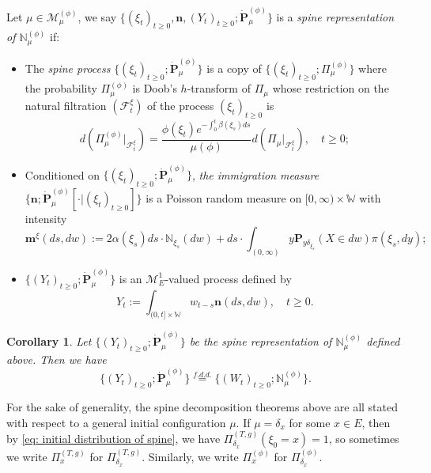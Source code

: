 \documentclass[12pt, a4paper]{amsart}
\newtheorem{cro}[thm]{Corollary}
\theoremstyle{definition}
\numberwithin{equation}{section}
\begin{document}
	Let $\mu \in \mathcal M^{(\phi)}_\mu$, we say $\{(\xi_t)_{t\geq 0}, \mathbf n, (Y_t)_{ t\geq 0}; \dot {\mathbf P}^{(\phi)}_\mu\}$ is a \emph{spine representation of $\mathbb N^{(\phi)}_\mu$} if:
\begin{itemize}
\item
	The \emph{spine process} $\{(\xi_t)_{t\geq 0}; \dot{\mathbf P}^{(\phi)}_\mu\}$ is a copy of $\{(\xi_t)_{t\geq 0}; \Pi^{(\phi)}_{\mu}\}$ where the probability $\Pi_{\mu}^{(\phi)}$ is Doob's $h$-transform of $\Pi_\mu$ whose restriction on the natural filtration $(\mathscr F_t^\xi)$ of the process $(\xi_t)_{t\geq 0}$ is
\begin{equation}
	d(\Pi_{\mu}^{(\phi)} |_{\mathscr F_t^\xi})
	= \frac{\phi(\xi_t)e^{-\int_0^t \beta(\xi_s)ds}}{\mu(\phi)} d(\Pi_{\mu} |_{\mathscr F_t^\xi}),
	\quad t\geq 0;
\end{equation}
\item
	Conditioned on $\{(\xi_t)_{t\geq 0}; \dot{\mathbf P}^{(\phi)}_\mu\}$, \emph{the immigration measure} $\{\mathbf n; \dot{\mathbf P}^{(\phi)}_\mu[\cdot |(\xi_t)_{t\geq 0}]\}$ is a Poisson random measure on $[0,\infty ) \times \mathbb W$ with
    intensity
\begin{equation}\label{eq:meanMeasImmigr}
	\mathbf m^\xi(ds,dw)
	:= 2 \alpha(\xi_s) ds \cdot \mathbb N_{\xi_s}(dw) + ds \cdot \int_{(0,\infty)} y \mathbf P_{y\delta_{\xi_s}}(X\in dw) \pi(\xi_s,dy);
\end{equation}
\item
	$\{(Y_t)_{t\geq 0}; \dot{\mathbf P}^{(\phi)}_\mu\}$ is an $\mathcal M^1_E$-valued process defined by
\begin{equation}\label{eq:defSpinImmigr}
	Y_t
	:= \int_{(0,t] \times \mathbb W} w_{t-s} \mathbf n(ds,dw),
	\quad t\geq 0.
\end{equation}
\end{itemize}

\begin{cro}
	Let $\{(Y_t)_{t\geq 0}; \dot {\mathbf P}^{(\phi)}_\mu\}$ be the spine representation of $\mathbb N^{(\phi)}_\mu$ defined above.
	Then we have
\begin{equation}
	\{(Y_t)_{t\geq 0}; \dot{\mathbf P}^{(\phi)}_\mu\}
	\overset{f.d.d.}{=} \{(W_t)_{t\geq 0}; \mathbb N_\mu^{(\phi)}\}.
\end{equation}
\end{cro}

	For the sake of generality, the spine decomposition theorems above are all stated with respect to a general initial configuration $\mu$.
	If $\mu = \delta_x$ for some $x\in E$, then by \eqref{eq: initial distribution of spine}, we have $\Pi_{\delta_x}^{(T,g)} (\xi_0 = x) = 1$, so sometimes we write $\Pi_x^{(T,g)}$ for $\Pi_{\delta_x}^{(T,g)}$.
	Similarly, we write $\Pi_x^{(\phi)}$ for $\Pi_{\delta_x}^{(\phi)}$.
\end{document}
